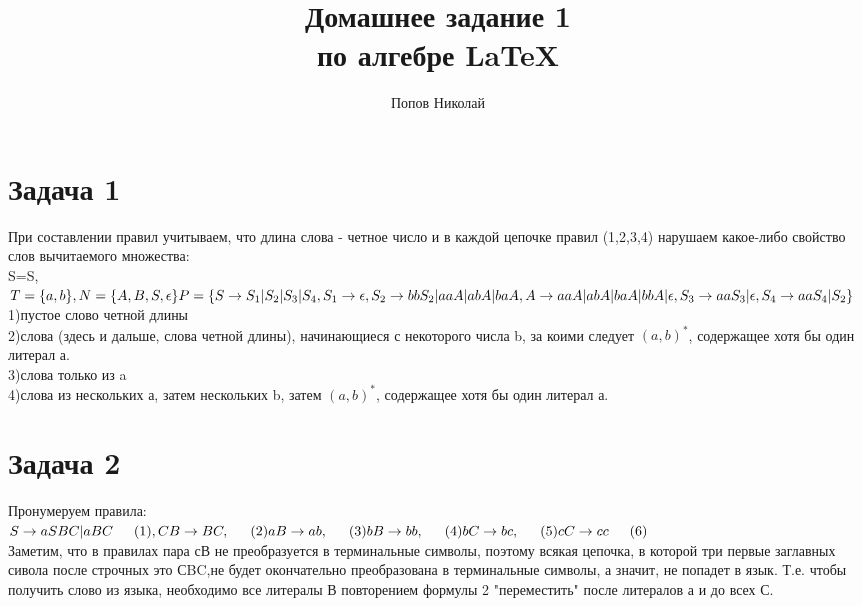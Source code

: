 \documentclass[a4paper,12pt]{article} %
\author{Попов Николай}
\title{Домашнее задание 1\\ по алгебре \LaTeX{}}
\begin{document}
 

\section*{Задача 1}
При составлении правил учитываем, что длина слова - четное число и в каждой цепочке правил (1,2,3,4) нарушаем какое-либо свойство слов вычитаемого множества:\\

S=S,
$ T=\{a, b\},
 N = \{A, B, S, \epsilon\}\\
P = \{
S \rightarrow S_1|S_2|S_3|S_4,\\ S_1 \rightarrow \epsilon,\\ S_2 \rightarrow bbS_2|aaA|abA|baA, \\ A \rightarrow aaA|abA|baA|bbA|\epsilon,\\ S_3 \rightarrow aaS_3|\epsilon, \\ S_4 \rightarrow aaS_4|S_2
\}
$\\

1)пустое слово четной длины \\
2)слова (здесь и дальше, слова четной длины), начинающиеся с некоторого числа b, за коими следует $(a,b)^*$, содержащее хотя бы один литерал а.\\
3)слова только из a\\
4)слова из нескольких а, затем нескольких b, затем $ (a,b)^*$, содержащее хотя бы один литерал а.\\


\section*{Задача 2}
Пронумеруем правила:\\
$
S\rightarrow aSBC|aBC \hspace{15pt}(1)\\,
 CB\rightarrow BC, \hspace{15pt}(2)\\
 aB\rightarrow ab,\hspace{15pt}(3)\\
  bB\rightarrow bb,\hspace{15pt}(4)\\
   bC\rightarrow bc,\hspace{15pt}(5)\\
    cC\rightarrow cc \hspace{15pt}(6)$\\


    
Заметим, что в правилах пара сВ не преобразуется в терминальные символы, поэтому всякая цепочка, в которой три первые заглавных сивола после строчных это СBC,не будет окончательно преобразована в терминальные символы, а значит, не попадет в язык. Т.е. чтобы получить слово из языка, необходимо все литералы В повторением формулы 2 "переместить" после литералов а и до всех С.\\
\end{document}
